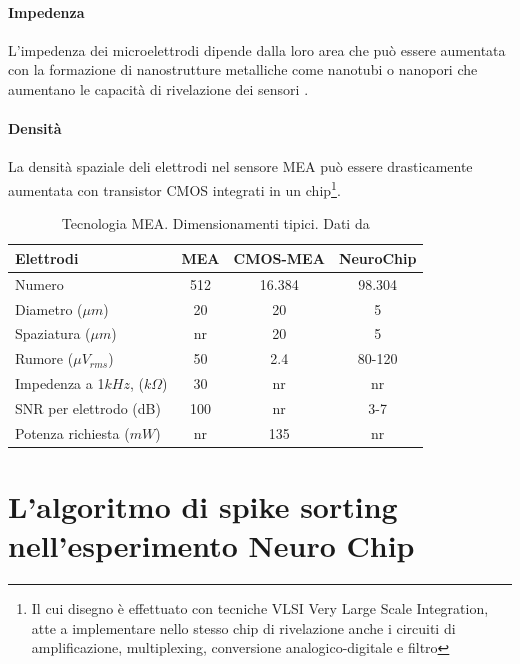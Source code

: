 \paragraph{Impedenza} L'impedenza dei microelettrodi dipende dalla loro area che può essere aumentata con la formazione di nanostrutture metalliche come nanotubi o nanopori che aumentano le capacità di rivelazione dei sensori \cite{Kim2014}.

\paragraph{Densità} La densità spaziale deli elettrodi nel sensore MEA può essere drasticamente aumentata con transistor CMOS integrati in un chip\footnote{Il cui disegno è effettuato con tecniche
VLSI {Very Large Scale Integration}, atte a implementare nello stesso chip di rivelazione anche i circuiti di amplificazione, multiplexing, conversione analogico-digitale e filtro}.

\begin{table}%
\begin{tabular}{l|c|c|c}
{\bf Elettrodi}             & MEA                & CMOS-MEA   & NeuroChip \\ \hline

Numero                   & 512 & 16.384 & 98.304    \\
Diametro ($\mu m$)       & 20  & 20     & 5         \\
Spaziatura ($\mu m$)     & nr  & 20     & 5         \\
Rumore ($\mu V_{rms}$)   & 50  & 2.4    & 80-120    \\
Impedenza a 1$kHz$, ($k\Omega$)
                         & 30  & nr     & nr \\ 
SNR per elettrodo (dB)   & 100 & nr     & 3-7 \\
Potenza richiesta ($mW$) &  nr & 135    & nr \\
\hline
\end{tabular}
\caption[Dimensionamenti tipici MEA]
{Tecnologia MEA. Dimensionamenti tipici. Dati da \cite{Kim2014, Vallicelli2017}}
\label{tab:DimensionamentoMea}
\end{table}



\section{L'algoritmo di spike sorting nell'esperimento Neuro Chip}
\label{sez:NeuroChip}

